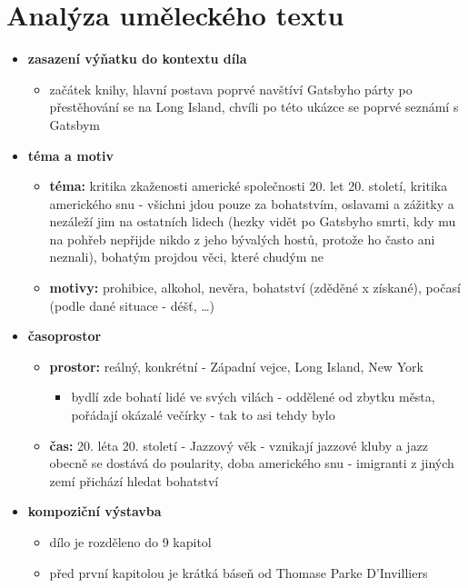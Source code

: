 \documentclass[11pt]{article}
\begin{document}
    \section*{Analýza uměleckého textu}
    \begin{itemize}
        \item\textbf{zasazení výňatku do kontextu díla}
        \begin{itemize}
            \item začátek knihy, hlavní postava poprvé navštíví Gatsbyho párty po přestěhování se na Long Island, chvíli po této ukázce se poprvé seznámí s Gatsbym
        \end{itemize}
        \item\textbf{téma a motiv}
        \begin{itemize}
            \item\textbf{téma:} kritika zkaženosti americké společnosti 20. let 20. století, kritika amerického snu - všichni jdou pouze za bohatstvím, oslavami a zážitky a nezáleží jim na ostatních lidech (hezky vidět po Gatsbyho smrti, kdy mu na pohřeb nepřijde nikdo z jeho bývalých hostů, protože ho často ani neznali), bohatým projdou věci, které chudým ne
            \item\textbf{motivy: }prohibice, alkohol, nevěra, bohatství (zděděné x získané), počasí (podle dané situace - déšť, \dots)
        \end{itemize}
        \item\textbf{časoprostor}
        \begin{itemize}
            \item\textbf{prostor: }reálný, konkrétní - Západní vejce, Long Island, New York
            \begin{itemize}
                \item bydlí zde bohatí lidé ve svých vilách - oddělené od zbytku města, pořádají okázalé večírky - tak to asi tehdy bylo
            \end{itemize}
            \item\textbf{čas: }20. léta 20. století - Jazzový věk - vznikají jazzové kluby a jazz obecně se dostává do poularity, doba amerického snu - imigranti z jiných zemí přichází hledat bohatství
        \end{itemize}
        \item\textbf{kompoziční výstavba}
        \begin{itemize}
            \item dílo je rozděleno do 9 kapitol
            \item před první kapitolou je krátká báseň od Thomase Parke D'Invilliers

\end{itemize}
\end{itemize}
\end{document}
